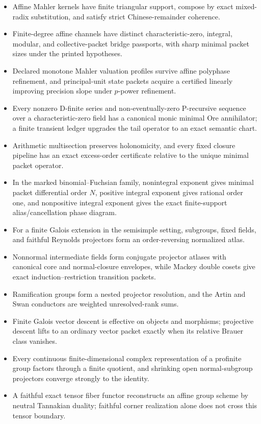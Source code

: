 \begin{itemize}
\item Affine Mahler kernels have finite triangular support, compose by exact mixed-radix substitution, and satisfy strict Chinese-remainder coherence.
\item Finite-degree affine channels have distinct characteristic-zero, integral, modular, and collective-packet bridge passports, with sharp minimal packet sizes under the printed hypotheses.
\item Declared monotone Mahler valuation profiles survive affine polyphase refinement, and principal-unit state packets acquire a certified linearly improving precision slope under \(p\)-power refinement.
\item Every nonzero D-finite series and non-eventually-zero P-recursive sequence over a characteristic-zero field has a canonical monic minimal Ore annihilator; a finite transient ledger upgrades the tail operator to an exact semantic chart.
\item Arithmetic multisection preserves holonomicity, and every fixed closure pipeline has an exact excess-order certificate relative to the unique minimal packet operator.
\item In the marked binomial--Fuchsian family, nonintegral exponent gives minimal packet differential order \(N\), positive integral exponent gives rational order one, and nonpositive integral exponent gives the exact finite-support alias/cancellation phase diagram.
\item For a finite Galois extension in the semisimple setting, subgroups, fixed fields, and faithful Reynolds projectors form an order-reversing normalized atlas.
\item Nonnormal intermediate fields form conjugate projector atlases with canonical core and normal-closure envelopes, while Mackey double cosets give exact induction--restriction transition packets.
\item Ramification groups form a nested projector resolution, and the Artin and Swan conductors are weighted unresolved-rank sums.
\item Finite Galois vector descent is effective on objects and morphisms; projective descent lifts to an ordinary vector packet exactly when its relative Brauer class vanishes.
\item Every continuous finite-dimensional complex representation of a profinite group factors through a finite quotient, and shrinking open normal-subgroup projectors converge strongly to the identity.
\item A faithful exact tensor fiber functor reconstructs an affine group scheme by neutral Tannakian duality; faithful corner realization alone does not cross this tensor boundary.

\end{itemize}
